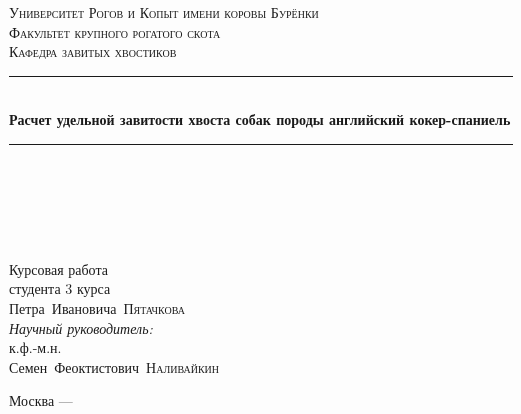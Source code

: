%
%
%
%

\begin{titlepage}

\newcommand{\HRule}{\rule{\linewidth}{0.5mm}}

\center


\textsc{\LARGE Университет Рогов и Копыт имени коровы Бурёнки}\\[1.5cm]
\textsc{\Large Факультет крупного рогатого скота}\\[0.5cm]
\textsc{\large Кафедра завитых хвостиков}\\[2.5cm]

\HRule \\[0.4cm]
{ \huge \bfseries Расчет удельной завитости хвоста собак породы английский кокер-спаниель}\\[0.25cm]
\HRule \\[2cm]


\begin{minipage}{0.4\textwidth}
\begin{flushleft} \large
~
\end{flushleft}
\end{minipage}
~
\begin{minipage}{0.4\textwidth}
\begin{flushright} \large
Курсовая работа\\
студента 3 курса\\
Петра\ Ивановича\ \textsc{Пятачкова}\\[1cm]
\emph{Научный руководитель:}\\
к.ф.-м.н.\\
Семен\ Феоктистович\ \textsc{Наливайкин}
\end{flushright}
\end{minipage}


\vfill
{\large Москва --- \the\year}

\end{titlepage}
